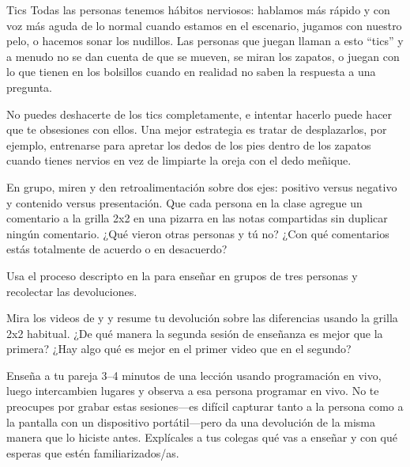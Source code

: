 \begin{aside}{Tics}
  Todas las personas tenemos hábitos nerviosos:
  hablamos más rápido y con voz más aguda de lo normal cuando estamos en el escenario,
  jugamos con nuestro pelo,
  o hacemos sonar los nudillos.
  Las personas que juegan llaman a esto ``tics''
  y a menudo no se dan cuenta de que se mueven,
  se miran los zapatos,
  o juegan con lo que tienen en los bolsillos
  cuando en realidad no saben la respuesta a una pregunta.

  No puedes deshacerte de los tics completamente,
  e intentar hacerlo puede hacer que te obsesiones con ellos.
  Una mejor estrategia es tratar de desplazarlos, por ejemplo,
  entrenarse para apretar los dedos de los pies dentro de los zapatos cuando tienes nervios
  en vez de limpiarte la oreja con el dedo meñique.
\end{aside}



En grupo,
miren 
y den retroalimentación sobre dos ejes:
positivo versus negativo y contenido versus presentación.
Que cada persona en la clase agregue un comentario a la grilla 2x2 en una pizarra en las notas compartidas
sin duplicar ningún comentario.
¿Qué vieron otras personas y tú no?
¿Con qué comentarios estás totalmente de acuerdo o en desacuerdo?


Usa el proceso descripto en la 
para enseñar en grupos de tres personas y recolectar las devoluciones.


Mira los videos de 
y 
y resume tu devolución sobre las diferencias usando la grilla 2x2 habitual.
¿De qué manera la segunda sesión de enseñanza es mejor que la primera?
¿Hay algo qué es mejor en el primer video que en el segundo?


Enseña a tu pareja 3--4 minutos de una lección usando programación en vivo,
luego intercambien lugares y observa a esa persona programar en vivo.
No te preocupes por grabar estas sesiones---es difícil capturar tanto a la persona como a la pantalla con un dispositivo portátil---pero
da una devolución de la misma manera que lo hiciste antes.
Explícales a tus colegas qué vas a enseñar y con qué esperas que estén familiarizados/as.


